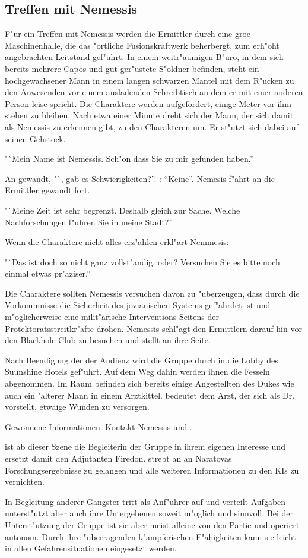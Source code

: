 \subsection{Treffen mit Nemessis}

F"ur ein Treffen mit Nemessis werden die Ermittler durch eine gro\3e Maschinenhalle, die das "ortliche Fusionskraftwerk beherbergt, zum erh"oht angebrachten Leitstand gef"uhrt. In einem weitr"aumigen B"uro, in dem sich bereits mehrere Capos und gut ger"ustete S"oldner befinden, steht ein hochgewachsener Mann in einem langen schwarzen Mantel mit dem R"ucken zu den Anwesenden vor einem ausladenden Schreibtisch an dem er mit einer anderen Person leise spricht. Die Charaktere werden aufgefordert, einige Meter vor ihm stehen zu bleiben. Nach etwa einer Minute dreht sich der Mann, der sich damit als Nemessis zu erkennen gibt, zu den Charakteren um. Er st"utzt sich dabei auf seinen Gehstock.

"`Mein Name ist Nemessis. Sch"on dass Sie zu mir gefunden haben.'' 

An \xl{} gewandt, "`\xlsn{}, gab es Schwierigkeiten?''. \xl{}:  "`Keine"'. Nemesis f"ahrt an die Ermittler gewandt fort. 

"`Meine Zeit ist sehr begrenzt. Deshalb gleich zur Sache. Welche Nachforschungen f"uhren Sie in meine Stadt?''

Wenn die Charaktere nicht alles erz"ahlen erkl"art Nemmesis:

"`Das ist doch so nicht ganz vollst"andig, oder? Versuchen Sie es bitte noch einmal etwas pr"aziser.''

Die Charaktere sollten Nemessis versuchen davon zu "uberzeugen, dass durch die Vorkommnisse die Sicherheit des jovianischen Systems gef"ahrdet ist und m"oglicherweise eine milit"arische Interventions Seitens der Protektoratsstreitkr"afte drohen. Nemessis schl"agt den Ermittlern darauf hin vor den Blackhole Club zu besuchen und stellt \xl{} an ihre Seite.

Nach Beendigung der der Audienz wird die Gruppe durch \xlsn{} in die Lobby des Suunshine Hotels gef"uhrt. Auf dem Weg dahin werden ihnen die Fesseln abgenommen. Im Raum befinden sich bereits einige Angestellten des Dukes wie auch ein "alterer Mann in einem Arztkittel. \xlsn{} bedeutet dem Arzt, der sich als Dr.~  vorstellt, etwaige Wunden zu versorgen.

\begin{remarks}
	Gewonnene Informationen: Kontakt Nemessis und \xl{}.

	\xl{} ist ab dieser Szene die Begleiterin der Gruppe in ihrem eigenen Interesse und ersetzt damit den Adjutanten Firedon. \xl{} strebt an an Naratovas Forschungsergebnisse zu gelangen und alle weiteren Informationen zu den KIs zu vernichten.

	In Begleitung anderer Gangster tritt \xl{} als Anf"uhrer auf und verteilt Aufgaben unterst"utzt aber auch ihre Untergebenen soweit m"oglich und sinnvoll. Bei der Unterst"utzung der Gruppe ist sie aber meist alleine von den Partie und operiert autonom. Durch ihre "uberragenden k"ampferischen F"ahigkeiten kann sie leicht in allen Gefahrensituationen eingesetzt werden.
\end{remarks}


